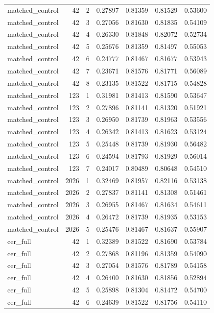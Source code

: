 \begin{tabular}{lrrrrrr}
matched_control & 42 & 2 & 0.27897 & 0.81359 & 0.81529 & 0.53600 \\
matched_control & 42 & 3 & 0.27056 & 0.81630 & 0.81835 & 0.54109 \\
matched_control & 42 & 4 & 0.26330 & 0.81848 & 0.82072 & 0.52734 \\
matched_control & 42 & 5 & 0.25676 & 0.81359 & 0.81497 & 0.55053 \\
matched_control & 42 & 6 & 0.24777 & 0.81467 & 0.81677 & 0.53943 \\
matched_control & 42 & 7 & 0.23671 & 0.81576 & 0.81771 & 0.56089 \\
matched_control & 42 & 8 & 0.23135 & 0.81522 & 0.81715 & 0.54828 \\
matched_control & 123 & 1 & 0.31981 & 0.81413 & 0.81590 & 0.53647 \\
matched_control & 123 & 2 & 0.27896 & 0.81141 & 0.81320 & 0.51921 \\
matched_control & 123 & 3 & 0.26950 & 0.81739 & 0.81963 & 0.53556 \\
matched_control & 123 & 4 & 0.26342 & 0.81413 & 0.81623 & 0.53124 \\
matched_control & 123 & 5 & 0.25448 & 0.81739 & 0.81930 & 0.56482 \\
matched_control & 123 & 6 & 0.24594 & 0.81793 & 0.81929 & 0.56014 \\
matched_control & 123 & 7 & 0.24017 & 0.80489 & 0.80648 & 0.54510 \\
matched_control & 2026 & 1 & 0.32469 & 0.81957 & 0.82116 & 0.53138 \\
matched_control & 2026 & 2 & 0.27837 & 0.81141 & 0.81308 & 0.51461 \\
matched_control & 2026 & 3 & 0.26955 & 0.81467 & 0.81634 & 0.54611 \\
matched_control & 2026 & 4 & 0.26472 & 0.81739 & 0.81935 & 0.53153 \\
matched_control & 2026 & 5 & 0.25476 & 0.81467 & 0.81637 & 0.55907 \\
cer_full & 42 & 1 & 0.32389 & 0.81522 & 0.81690 & 0.53784 \\
cer_full & 42 & 2 & 0.27868 & 0.81196 & 0.81359 & 0.54090 \\
cer_full & 42 & 3 & 0.27054 & 0.81576 & 0.81789 & 0.54158 \\
cer_full & 42 & 4 & 0.26400 & 0.81630 & 0.81856 & 0.52894 \\
cer_full & 42 & 5 & 0.25898 & 0.81304 & 0.81472 & 0.54700 \\
cer_full & 42 & 6 & 0.24639 & 0.81522 & 0.81756 & 0.54110 \\

\end{tabular}
